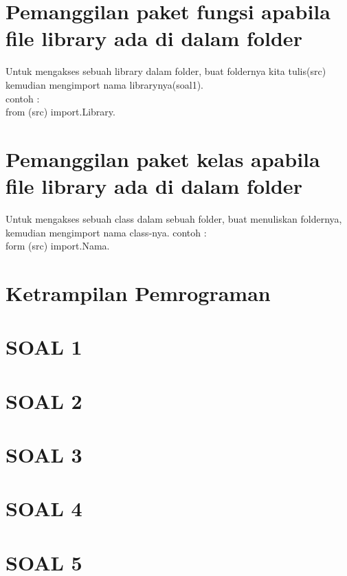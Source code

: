 \documentclass[12pt, times new roman]{report}
\begin{document}


\section{Pemanggilan paket fungsi apabila file library ada di dalam folder
}
\hspace{1cm}Untuk mengakses sebuah library dalam folder, buat foldernya kita
tulis(src) kemudian mengimport nama librarynya(soal1).\\
contoh :\\
from (src) import.Library.

\section{Pemanggilan paket kelas apabila file library ada di dalam folder}
\hspace{1cm}Untuk mengakses sebuah class dalam sebuah folder, buat menuliskan
foldernya, kemudian mengimport nama class-nya.
contoh :\\
form (src) import.Nama.

\section{Ketrampilan Pemrograman}
\section*{SOAL 1}


\section*{SOAL 2}


\section*{SOAL 3}


\section*{SOAL 4}


\section*{SOAL 5}

\end{document}
